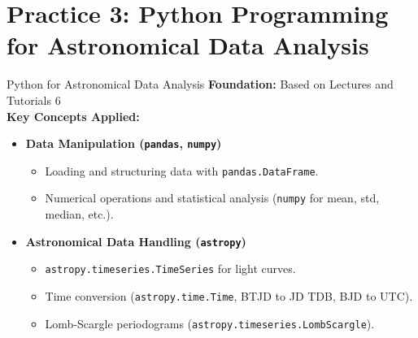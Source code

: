 \documentclass[12pt, aspectratio=169]{beamer}
\renewcommand{\small}{\fontsize{11}{13}\selectfont}
\newcommand{\rcode}[1]{{\small\texttt{#1}}}
\begin{document}
  \section{Practice 3: Python Programming for Astronomical Data Analysis}
  \begin{frame}[t]{Python for Astronomical Data Analysis}
    \textbf{Foundation:} Based on Lectures and Tutorials 6
    \\\vspace{2.5mm}
    \textbf{Key Concepts Applied:} \\\vspace{2.5mm}
    \begin{itemize}
      \item \textbf{Data Manipulation (\rcode{pandas}, \rcode{numpy})} \vspace{1mm}
      \begin{itemize}
        \item Loading and structuring data with \rcode{pandas.DataFrame}.
        \item Numerical operations and statistical analysis (\rcode{numpy}
        for mean, std, median, etc.).
      \end{itemize} \vspace{1mm}
      \item \textbf{Astronomical Data Handling (\rcode{astropy})} \vspace{1mm}
      \begin{itemize}
        \item \rcode{astropy.timeseries.TimeSeries} for light curves.
        \item Time conversion (\rcode{astropy.time.Time}, BTJD to JD TDB, BJD
        to UTC).
        \item Lomb-Scargle periodograms (\rcode{astropy.timeseries.LombScargle}).
      \end{itemize}
    \end{itemize}
  \end{frame}
\end{document}
